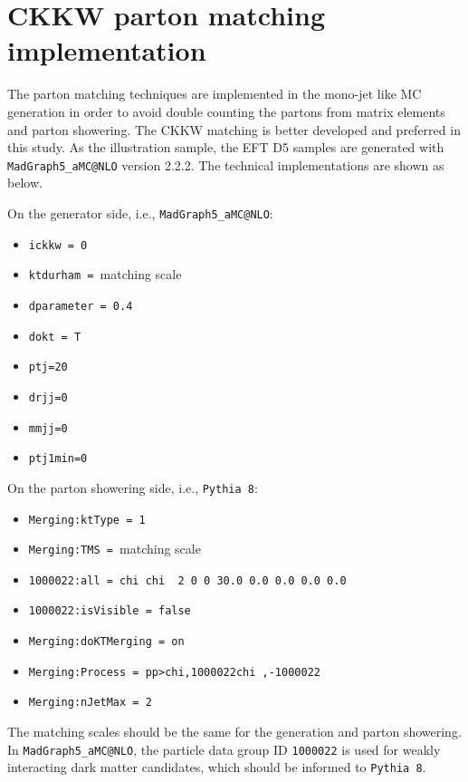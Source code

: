 
\section{CKKW parton matching implementation}
\label{sec:monojet_parton_match}

The parton matching techniques are implemented in the mono-jet like MC generation in order to avoid double counting the partons from matrix elements and parton showering. The CKKW matching is better developed and preferred in this study. As the illustration sample, the EFT D5 samples are generated with \texttt{MadGraph5\_aMC@NLO} version 2.2.2. The technical implementations are shown as below.

On the generator side, i.e., \texttt{MadGraph5\_aMC@NLO}:
\begin{itemize}
\item \texttt{ickkw = 0}
\item \texttt{ktdurham = }matching scale
\item \texttt{dparameter = 0.4}
\item \texttt{dokt = T}
\item \texttt{ptj=20}
\item \texttt{drjj=0}
\item \texttt{mmjj=0}
\item \texttt{ptj1min=0}
\end{itemize}
On the parton showering side, i.e., \texttt{Pythia 8}:
\begin{itemize}
\item \texttt{Merging:ktType           = 1}
\item \texttt{Merging:TMS              = }matching scale
\item \texttt{1000022:all = chi chi~ 2 0 0 30.0 0.0 0.0 0.0 0.0}
\item \texttt{1000022:isVisible = false}
\item \texttt{Merging:doKTMerging      = on}
\item \texttt{Merging:Process          = pp>{chi,1000022}{chi~,-1000022}}
\item \texttt{Merging:nJetMax          = 2}
\end{itemize}
The matching scales should be the same for the generation and parton showering. In \texttt{MadGraph5\_aMC@NLO}, the particle data group ID \texttt{1000022} is used for weakly interacting dark matter candidates, which should be informed to \texttt{Pythia 8}. 

